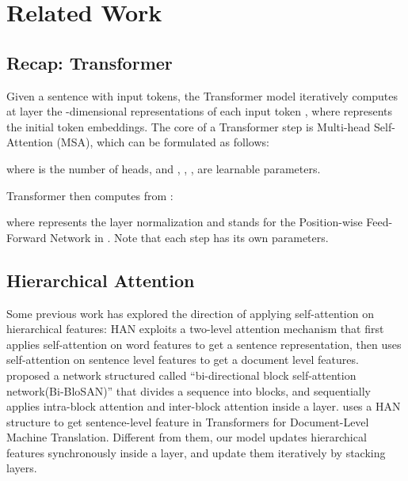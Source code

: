 \documentclass[11pt,a4paper]{article}
\begin{document}
\section{Related Work}


\subsection{Recap: Transformer}
Given a sentence with  input tokens, the Transformer model iteratively computes at layer  the -dimensional representations of each input token , where  represents the initial token embeddings.
The core of a Transformer step is Multi-head Self-Attention (MSA), which can be formulated as follows:

where  is the number of heads, and , , ,  are learnable parameters.

Transformer then computes  from :

where  represents the layer normalization \citep{ba2016layer} and  stands for the Position-wise Feed-Forward Network in \citep{vaswani2017attention}.
Note that each step  has its own parameters.

\subsection{Hierarchical Attention}

Some previous work has explored the direction of applying self-attention on hierarchical features: HAN \citep{yang2016hierarchical} exploits a two-level attention mechanism that first applies self-attention on word features to get a sentence representation, then uses self-attention on sentence level features to get a document level features. \citet{shen2018bi} proposed a network structured called ``bi-directional block self-attention network(Bi-BloSAN)'' that divides a sequence into blocks, and sequentially applies intra-block attention and inter-block attention inside a layer. \citet{miculicich-etal-2018-document} uses a HAN structure to get sentence-level feature in Transformers for Document-Level Machine Translation. Different from them, our model updates hierarchical features synchronously inside a layer, and update them iteratively by stacking layers.
\end{document}
